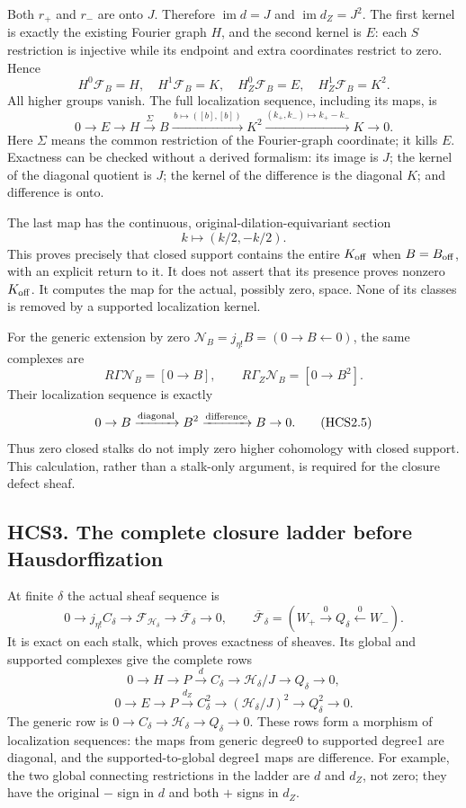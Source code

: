 Both \(r_+\) and \(r_-\) are onto \(J\). Therefore
\(\operatorname{im}d=J\) and \(\operatorname{im}d_Z=J^2\). The first
kernel is exactly the existing Fourier graph \(H\), and the second
kernel is \(E\): each \(S\) restriction is injective while its endpoint
and extra coordinates restrict to zero. Hence \[
H^0\mathcal F_B=H,\quad H^1\mathcal F_B=K,\quad
H_Z^0\mathcal F_B=E,\quad H_Z^1\mathcal F_B=K^2.
\tag{HCS2.2}
\] All higher groups vanish. The full localization sequence, including
its maps, is \[
\boxed{
0\to E\to H\xrightarrow{\ \Sigma\ }B
\xrightarrow{\,b\mapsto([b],[b])\,}K^2
\xrightarrow{(k_+,k_-)\mapsto k_+-k_-}K\to0.}
\tag{HCS2.3}
\] Here \(\Sigma\) means the common restriction of the Fourier-graph
coordinate; it kills \(E\). Exactness can be checked without a derived
formalism: its image is \(J\); the kernel of the diagonal quotient is
\(J\); the kernel of the difference is the diagonal \(K\); and
difference is onto.

The last map has the continuous, original-dilation-equivariant section
\[
k\longmapsto(k/2,-k/2).
\tag{HCS2.4}
\] This proves precisely that closed support contains the entire
\(K_{\rm off}\) when \(B=B_{\rm off}\), with an explicit return to it.
It does not assert that its presence proves nonzero \(K_{\rm off}\). It
computes the map for the actual, possibly zero, space. None of its
classes is removed by a supported localization kernel.

For the generic extension by zero
\(\mathcal N_B=j_{\eta!}B=(0\to B\leftarrow0)\), the same complexes are
\[
R\Gamma\mathcal N_B=[0\to B],\qquad
R\Gamma_Z\mathcal N_B=[0\to B^2].
\] Their localization sequence is exactly \[
0\to B\xrightarrow{\rm diagonal}B^2
\xrightarrow{\rm difference}B\to0.
\tag{HCS2.5}
\] Thus zero closed stalks do not imply zero higher cohomology with
closed support. This calculation, rather than a stalk-only argument, is
required for the closure defect sheaf.

\subsection{HCS3. The complete closure ladder before
Hausdorffization}\label{hcs3.-the-complete-closure-ladder-before-hausdorffization}

At finite \(\delta\) the actual sheaf sequence is \[
0\to j_{\eta!}C_\delta\to\mathcal F_{\mathcal H_\delta}
\to\overline{\mathcal F}_\delta\to0,\qquad
\overline{\mathcal F}_\delta
=(W_+\xrightarrow0Q_\delta\xleftarrow0W_-).
\tag{HCS3.1}
\] It is exact on each stalk, which proves exactness of sheaves. Its
global and supported complexes give the complete rows \[
0\to H\to P\xrightarrow d C_\delta
\to\mathcal H_\delta/J\to Q_\delta\to0,
\tag{HCS3.2}
\] \[
0\to E\to P\xrightarrow{d_Z}C_\delta^2
\to(\mathcal H_\delta/J)^2\to Q_\delta^2\to0.
\tag{HCS3.3}
\] The generic row is
\(0\to C_\delta\to\mathcal H_\delta\to Q_\delta\to0\). These rows form a
morphism of localization sequences: the maps from generic degree0 to
supported degree1 are diagonal, and the supported-to-global degree1 maps
are difference. For example, the two global connecting restrictions in
the ladder are \(d\) and \(d_Z\), not zero; they have the original \(-\)
sign in \(d\) and both \(+\) signs in \(d_Z\).

